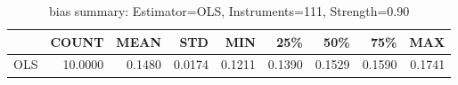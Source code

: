 \begin{table}[ht]
\centering
\caption{bias summary: Estimator=OLS, Instruments=111, Strength=0.90}
\begin{tabular}{lrrrrrrrr}
\toprule
 & COUNT & MEAN & STD & MIN & 25\% & 50\% & 75\% & MAX \\
\midrule
OLS & 10.0000 & 0.1480 & 0.0174 & 0.1211 & 0.1390 & 0.1529 & 0.1590 & 0.1741 \\
\bottomrule
\end{tabular}
\end{table}
